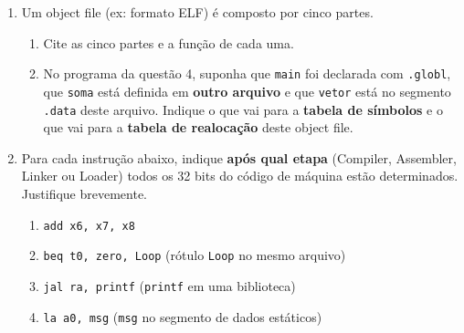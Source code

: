 \documentclass[11pt, a4paper]{article}
\begin{document}
\begin{enumerate}
\begin{enumerate}
  \item Por que o assembler \textbf{n\~{a}o consegue} gerar todo o c\'{o}digo de m\'{a}quina em uma \'{u}nica passagem sobre esse programa? Aponte a instru\c{c}\~{a}o que causa o problema.
  \item Descreva o que o assembler faz em cada uma das \textbf{duas passagens}.
  \item Monte a \textbf{tabela de s\'{i}mbolos} do trecho (label $\rightarrow$ endere\c{c}o).
  \item Calcule o deslocamento em bytes (com sinal) do \texttt{beq} e do \texttt{j}.
\end{enumerate}

\newpage
\setlength{\itemsep}{48pt} %
\item Um object file (ex: formato ELF) \'{e} composto por cinco partes.
\begin{enumerate}
  \item Cite as cinco partes e a fun\c{c}\~{a}o de cada uma.
  \item No programa da quest\~{a}o 4, suponha que \texttt{main} foi declarada com \texttt{.globl}, que \texttt{soma} est\'{a} definida em \textbf{outro arquivo} e que \texttt{vetor} est\'{a} no segmento \texttt{.data} deste arquivo. Indique o que vai para a \textbf{tabela de s\'{i}mbolos} e o que vai para a \textbf{tabela de realoca\c{c}\~{a}o} deste object file.
\end{enumerate}

\item Para cada instru\c{c}\~{a}o abaixo, indique \textbf{ap\'{o}s qual etapa} (Compiler, Assembler, Linker ou Loader) todos os 32 bits do c\'{o}digo de m\'{a}quina est\~{a}o determinados. Justifique brevemente.
\begin{enumerate}
  \item \texttt{add x6, x7, x8}
  \item \texttt{beq t0, zero, Loop} \quad (r\'{o}tulo \texttt{Loop} no mesmo arquivo)
  \item \texttt{jal ra, printf} \quad (\texttt{printf} em uma biblioteca)
  \item \texttt{la a0, msg} \quad (\texttt{msg} no segmento de dados est\'{a}ticos)
\end{enumerate}


\end{enumerate}
\end{document}
